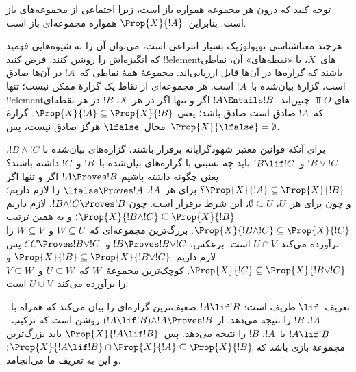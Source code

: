 \documentclass[../../../include/open-logic-section]{subfiles}
\begin{document}
توجه کنید که درون هر مجموعه همواره باز است، زیرا اجتماعی از مجموعه‌های
باز است. بنابراین~$\Prop{X}{!A}$ همواره مجموعه‌ای باز است.

هرچند معناشناسی توپولوژیک بسیار انتزاعی است، می‌توان آن را به شیوه‌هایی
فهمید که انگیزه‌اش را روشن کنند. فرض کنید !!{element}های~$X$، یا
«نقطه‌های» آن، نقاطی باشند که گزاره‌ها در آن‌ها قابل ارزیابی‌اند.
مجموعهٔ همهٔ نقاطی که~$!A$ در آن‌ها صادق است، گزارهٔ بیان‌شده با~$!A$
است. هر مجموعه‌ای از نقاط یک گزارهٔ ممکن نیست؛ تنها !!{element}های
$\Top{O}$ چنین‌اند. $!A \Entails !B$ اگر و تنها اگر در هر~$X$، $!B$
در هر نقطه‌ای که~$!A$ صادق است صادق باشد؛ یعنی
$\Prop{X}{!A} \subseteq \Prop{X}{!B}$. گزارهٔ محال~$\lfalse$ هرگز
صادق نیست، پس~$\Prop{X}{\lfalse} = \emptyset$.

برای آنکه قوانین معتبر شهودگرایانه برقرار باشند، گزاره‌های بیان‌شده با
$!B \land !C$، $!B \lor !C$ و~$!B \lif !C$ باید چه نسبتی با گزاره‌های
بیان‌شده با~$!B$ و~$!C$ داشته باشند؟ یعنی چگونه داشته باشیم
$!A \Proves !B$ اگر و تنها اگر
$\Prop{X}{!A} \subseteq \Prop{X}{!B}$؟ برای هر~$!A$،
$\lfalse \Proves !A$ را لازم داریم؛ و چون برای هر~$U$،
$\emptyset \subseteq U$، این شرط برقرار است. چون
$!B \land !C \Proves !B$، لازم داریم
$\Prop{X}{!B \land !C} \subseteq \Prop{X}{!B}$؛ و به همین ترتیب
$\Prop{X}{!B \land !C} \subseteq \Prop{X}{!C}$. بزرگ‌ترین مجموعه‌ای
که~$W \subseteq U$ و~$W \subseteq V$ را برآورده می‌کند~$U \cap V$
است. برعکس، $!B \Proves !B \lor !C$ و~$!C \Proves !B \lor !C$؛ پس
لازم داریم~$\Prop{X}{!B} \subseteq \Prop{X}{!B \lor !C}$ و
$\Prop{X}{!C} \subseteq \Prop{X}{!B \lor !C}$. کوچک‌ترین مجموعهٔ~$W$
که~$U \subseteq W$ و~$V \subseteq W$ را برآورده می‌کند~$U \cup V$
است.

تعریف~$\lif$ ظریف است: $!A \lif !B$ ضعیف‌ترین گزاره‌ای را بیان می‌کند
که همراه با~$!A$، $!B$ را نتیجه می‌دهد. از
$(!A \lif !B) \land !A \Proves !B$ روشن است که ترکیب~$!A \lif !B$
با~$!A$، $!B$ را نتیجه می‌دهد. پس~$\Prop{X}{!A \lif !B}$ باید
بزرگ‌ترین مجموعهٔ بازی باشد که
$\Prop{X}{!A \lif !B} \cap \Prop{X}{!A}
\subseteq \Prop{X}{!B}$؛ و این به تعریف ما می‌انجامد.
\end{document}
